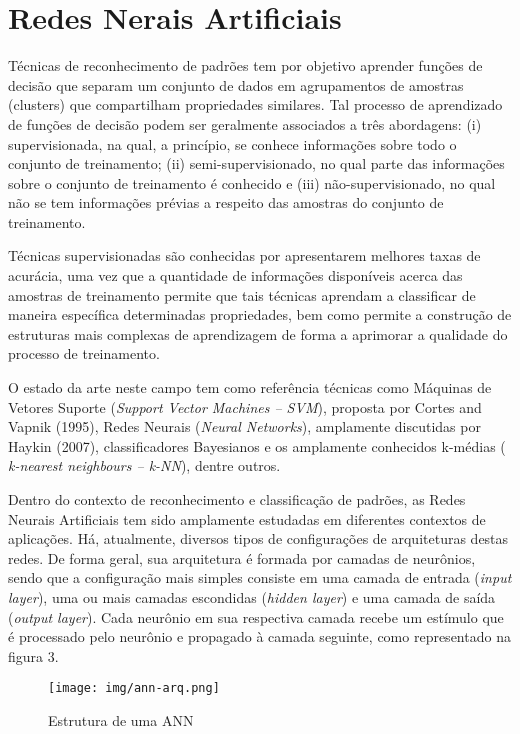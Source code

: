 \newpage
\section{Redes Nerais Artificiais}\label{sec:rna}

Técnicas de reconhecimento de padrões tem por objetivo aprender funções de decisão que separam um conjunto de dados em agrupamentos de amostras (clusters) que compartilham propriedades similares\cite{Duda:00}. Tal processo de aprendizado de funções de decisão podem ser geralmente associados a três abordagens: (i) supervisionada, na qual, a princípio, se conhece informações sobre todo o conjunto de treinamento; (ii) semi-supervisionado, no qual parte das informações sobre o conjunto de treinamento é conhecido e (iii) não-supervisionado, no qual não se tem informações prévias a respeito das amostras do conjunto de treinamento. 

Técnicas supervisionadas são conhecidas por apresentarem melhores taxas de acurácia, uma vez que a quantidade de informações disponíveis acerca das amostras de treinamento permite que tais técnicas aprendam a classificar de maneira específica determinadas propriedades, bem como permite a construção de estruturas mais complexas de aprendizagem de forma a aprimorar a qualidade do processo de treinamento.

O estado da arte neste campo tem como referência técnicas como Máquinas de Vetores Suporte (\textit{Support Vector Machines – SVM}), proposta por Cortes and Vapnik (1995), Redes Neurais (\textit{Neural Networks}), amplamente discutidas por Haykin (2007), classificadores Bayesianos e os amplamente conhecidos k-médias ( \textit{k-nearest neighbours – k-NN}), dentre outros\cite{Duda:00}. 

Dentro do contexto de reconhecimento e classificação de padrões, as Redes Neurais Artificiais tem sido amplamente estudadas em diferentes contextos de aplicações. Há, atualmente, diversos tipos de configurações de arquiteturas destas redes. De forma geral, sua arquitetura é formada por camadas de neurônios, sendo que a configuração mais simples consiste em uma camada de entrada (\textit{input layer}), uma ou mais camadas escondidas (\textit{hidden layer}) e uma camada de saída (\textit{output layer}). Cada neurônio em sua respectiva camada recebe um estímulo que é processado pelo neurônio e propagado à camada seguinte, como representado na figura 3. 
\begin{figure}[ht!]
	\caption{Estrutura de uma ANN}
	\label{fig:ann-arq}
	\begin{center}
		\texttt{[image: img/ann-arq.png]}
	\end{center}
\end{figure}


